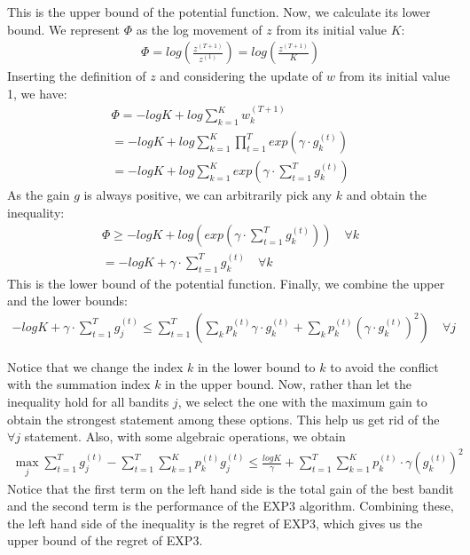 \documentclass[11pt]{article}
\begin{document}
This is the upper bound of the potential function. Now, we calculate its lower bound. We represent $\Phi$ as the log movement of $z$ from its initial value $K$:
\begin{align}
    \Phi = log(\frac{z^{(T+1)}}{z^{(1)}}) = log(\frac{z^{(T+1)}}{K})
\end{align}
Inserting the definition of $z$ and considering the update of $w$ from its initial value 1, we have:
\begin{align}
    \Phi = -logK + log\sum_{k=1}^{K}w_k^{(T+1)} \\
    = -logK + log\sum_{k=1}^{K}\prod_{t=1}^T exp(\gamma \cdot g_k^{(t)})\\
    = -logK + log\sum_{k=1}^{K} exp(\gamma \cdot \sum_{t=1}^T g_k^{(t)})
\end{align}
As the gain $g$ is always positive, we can arbitrarily pick any $k$ and obtain the inequality:
\begin{align}
    \Phi \geq -logK + log( exp(\gamma \cdot \sum_{t=1}^T g_k^{(t)})) \quad \forall k \\
    = -logK + \gamma \cdot \sum_{t=1}^T g_k^{(t)} \quad \forall k
\end{align}
This is the lower bound of the potential function. Finally, we combine the upper and the lower bounds:
\begin{align}
    -logK + \gamma \cdot \sum_{t=1}^T g_j^{(t)} \leq \sum_{t=1}^T (\sum_{k}p_k^{(t)}\gamma \cdot g_k^{(t)} + \sum_{k}p_k^{(t)}(\gamma \cdot g_k^{(t)})^2) \quad \forall j
\end{align}

Notice that we change the index $k$ in the lower bound to $k$ to avoid the conflict with the summation index $k$ in the upper bound. Now, rather than let the inequality hold for all bandits $j$, we select the one with the maximum gain to obtain the strongest statement among these options. This help us get rid of the $\forall j$ statement. Also, with some algebraic operations, we obtain
\begin{align}
    \max_j \sum_{t=1}^T g_j^{(t)} - \sum_{t=1}^T \sum_{k=1}^K p_k^{(t)} g_j^{(t)} \leq \frac{logK}{\gamma} + \sum_{t=1}^T \sum_{k=1}^K p_k^{(t)} \cdot \gamma (g_k^{(t)})^2
\end{align}
Notice that the first term on the left hand side is the total gain of the best bandit and the second term is the performance of the EXP3 algorithm. Combining these, the left hand side of the inequality is the regret of EXP3, which gives us the upper bound of the regret of EXP3.
\end{document}

